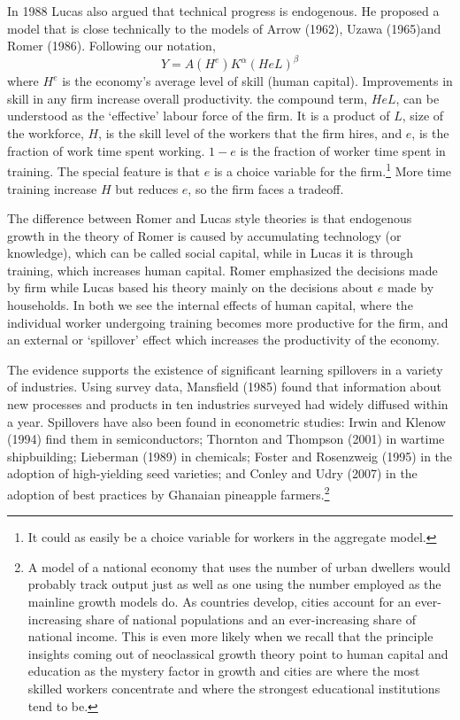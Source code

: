 In 1988 Lucas also argued that technical progress is endogenous. He proposed a model that is  close technically to the models of Arrow (1962), Uzawa (1965)and Romer (1986). Following our notation, 
\[ Y = A(H^e) K^\alpha (HeL)^\beta \] 
where $H^e$ is the economy's average level of skill (human capital).  Improvements in skill in any firm  increase overall productivity.  the compound term, $HeL$,  can be understood as the `effective' labour force of the firm. It is a product of $L$, size of the workforce, $H$, is the skill level of the  workers that the firm hires, and $e$, is the fraction of work time spent working. $1-e$ is the fraction of worker time  spent in training. The  special feature is that $e$ is a choice variable for the firm.\footnote{It could as easily be a choice variable for workers in the aggregate model.} More time training increase $H$ but reduces $e$, so the firm faces a tradeoff.

The difference between Romer and Lucas style theories is that endogenous growth in the theory of Romer is caused by accumulating technology (or knowledge), which can be called social capital, while in Lucas it is through training, which increases human capital. %
Romer emphasized the decisions made by firm while Lucas  based his theory mainly on the decisions about $e$ made by households. In both we see the  internal effects of human capital, where the individual worker undergoing training becomes more productive for the firm, and an external or `spillover' effect which increases the productivity of the economy. 

The evidence supports the existence of significant learning spillovers in a variety of industries. Using survey data, Mansfield (1985) found that information about new processes and products in ten industries surveyed had widely diffused within a year. Spillovers have also been found in econometric studies: Irwin and Klenow (1994) find them in semiconductors; Thornton and Thompson (2001) in wartime shipbuilding; Lieberman (1989) in chemicals; Foster and Rosenzweig (1995) in the adoption of high-yielding seed varieties; and Conley and Udry (2007) in the adoption of best practices by Ghanaian pineapple farmers.\footnote{A model of a national economy that uses the number of urban dwellers would probably track output just as well as one using the number employed as the mainline growth models do. As countries develop, cities account for an ever-increasing share of  national populations and an ever-increasing share of national income.  This is  even more likely when we recall that the principle insights coming out of neoclassical growth theory point to human capital and education as the mystery factor in growth and cities are where the most skilled workers concentrate and where the strongest educational institutions tend to be. } 



